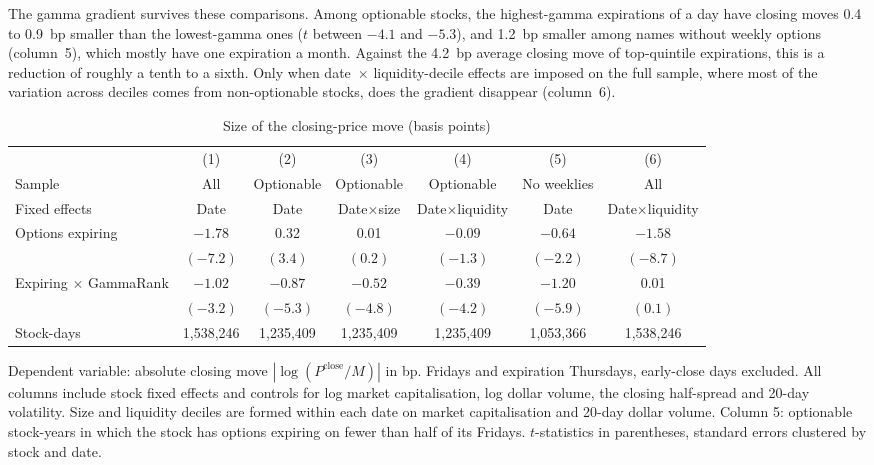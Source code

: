\documentclass[11pt,a4paper]{article}
\begin{document}
The gamma gradient survives these comparisons. Among optionable stocks, the highest-gamma expirations of a day have closing moves 0.4 to 0.9~bp smaller than the lowest-gamma ones ($t$ between $-4.1$ and $-5.3$), and 1.2~bp smaller among names without weekly options (column~5), which mostly have one expiration a month. Against the 4.2~bp average closing move of top-quintile expirations, this is a reduction of roughly a tenth to a sixth. Only when date~$\times$ liquidity-decile effects are imposed on the full sample, where most of the variation across deciles comes from non-optionable stocks, does the gradient disappear (column~6).

\begin{table}[ht]
\centering
\begin{threeparttable}
\caption{Size of the closing-price move (basis points)}
\label{tab:mag}
\footnotesize
\setlength{\tabcolsep}{4pt}
\begin{tabular}{lcccccc}
\toprule
 & (1) & (2) & (3) & (4) & (5) & (6) \\
Sample & All & Optionable & Optionable & Optionable & No weeklies & All \\
Fixed effects & Date & Date & Date$\times$size & Date$\times$liquidity & Date & Date$\times$liquidity \\
\midrule
Options expiring & $-1.78$ & 0.32 & 0.01 & $-0.09$ & $-0.64$ & $-1.58$ \\
 & $(-7.2)$ & $(3.4)$ & $(0.2)$ & $(-1.3)$ & $(-2.2)$ & $(-8.7)$ \\
Expiring $\times$ GammaRank & $-1.02$ & $-0.87$ & $-0.52$ & $-0.39$ & $-1.20$ & 0.01 \\
 & $(-3.2)$ & $(-5.3)$ & $(-4.8)$ & $(-4.2)$ & $(-5.9)$ & $(0.1)$ \\
\midrule
Stock-days & 1,538,246 & 1,235,409 & 1,235,409 & 1,235,409 & 1,053,366 & 1,538,246 \\
\bottomrule
\end{tabular}
\begin{tablenotes}\footnotesize
\item Dependent variable: absolute closing move $|\log(P^{\text{close}}/M)|$ in bp. Fridays and expiration Thursdays, early-close days excluded. All columns include stock fixed effects and controls for log market capitalisation, log dollar volume, the closing half-spread and 20-day volatility. Size and liquidity deciles are formed within each date on market capitalisation and 20-day dollar volume. Column 5: optionable stock-years in which the stock has options expiring on fewer than half of its Fridays. $t$-statistics in parentheses, standard errors clustered by stock and date.
\end{tablenotes}
\end{threeparttable}
\end{table}
\end{document}
